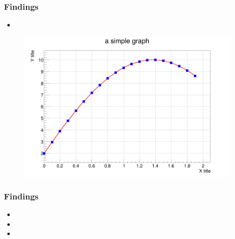\documentclass{beamer}
\begin{document}
\begin{frame}
\frametitle{Findings}
\begin{itemize}
    \item 
\end{itemize}

\begin{figure}[!h]
\begin{small}
\centering
\linespread{1.0}
\includegraphics[width=0.75\linewidth]{images/pict1_graph.C}
\label{fig:fig13}
\end{small}
\end{figure}

\end{frame}

\begin{frame}
\frametitle{Findings}
\begin{itemize}
    \item 
    \item 
    \item
\end{itemize}

\end{frame}
\end{document}
